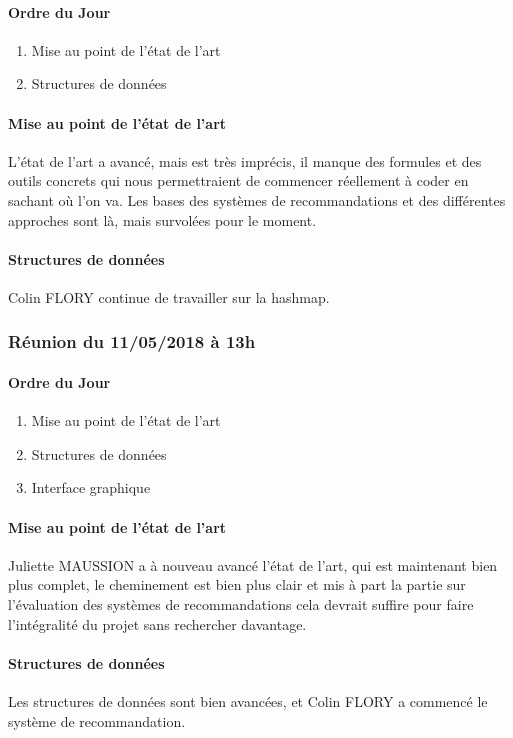 \documentclass{article}
\begin{document}
\paragraph*{Ordre du Jour}
\begin{enumerate}
\item Mise au point de l'état de l'art
\item Structures de données
\end{enumerate}
\paragraph*{Mise au point de l'état de l'art}\mbox{}
L'état de l'art a avancé, mais est très imprécis, il manque des formules et des outils concrets qui nous permettraient de commencer réellement à coder en sachant où l'on va. Les bases des systèmes de recommandations et des différentes approches sont là, mais survolées pour le moment.
\paragraph*{Structures de données}\mbox{}
Colin FLORY continue de travailler sur la hashmap. 

\subsubsection*{Réunion du 11/05/2018 à 13h}
\paragraph*{Ordre du Jour}
\begin{enumerate}
\item Mise au point de l'état de l'art
\item Structures de données
\item Interface graphique
\end{enumerate}
\paragraph*{Mise au point de l'état de l'art}\mbox{}
Juliette MAUSSION a à nouveau avancé l'état de l'art, qui est maintenant bien plus complet, le cheminement est bien plus clair et mis à part la partie sur l'évaluation des systèmes de recommandations cela devrait suffire pour faire l'intégralité du projet sans rechercher davantage. 
\paragraph*{Structures de données}\mbox{}
Les structures de données sont bien avancées, et Colin FLORY a commencé le système de recommandation. 
\end{document}

